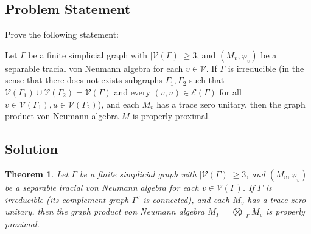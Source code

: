 \documentclass[12pt]{article}
\newtheorem{theorem}{Theorem}
\newcommand{\VV}{\mathcal{V}}
\newcommand{\EE}{\mathcal{E}}
\newcommand{\GG}{\Gamma}
\begin{document}
\date{}



\subsection*{Problem Statement}

Prove the following statement:

Let $\Gamma$ be a finite simplicial graph with $|\VV(\GG)|\geq 3$, and $(M_v,\varphi_v)$ be a separable tracial von Neumann algebra for each $v\in \VV$. If $\Gamma$ is irreducible (in the sense that there does not exists subgraphs $\GG_1,\GG_2$ such that $ \VV(\GG_1)\cup \VV(\GG_2)=\VV(\GG) $ and every $(v,u)\in \EE(\GG) $ for all $v\in\VV(\GG_1),u\in \VV(\GG_2)$), and each $M_v$ has a trace zero unitary, then the graph product von Neumann algebra $M$ is properly proximal.

\subsection*{Solution}

\begin{theorem}
Let $\Gamma$ be a finite simplicial graph with $|\VV(\Gamma)|\geq 3$, and $(M_v,\varphi_v)$ be a separable tracial von Neumann algebra for each $v\in \VV(\Gamma)$. If $\Gamma$ is irreducible (its complement graph $\Gamma^c$ is connected), and each $M_v$ has a trace zero unitary, then the graph product von Neumann algebra $M_\Gamma = \overline{\bigotimes}_\Gamma M_v$ is properly proximal.
\end{theorem}
\end{document}
